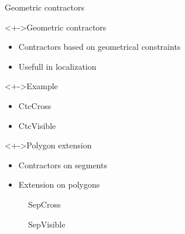 \documentclass[10pt, xcolor={usenames, dvipsnames}]{beamer}
\begin{document}
    \begin{frame}{Geometric contractors}
        \begin{minipage}[c]{.45\textwidth}
            \begin{block}<+->{Geometric contractors}
                \vspace{2.5mm}
                \begin{itemize}[<+->]
                    \item Contractors based on geometrical constraints
                    \item Usefull in localization
                \end{itemize}
            \end{block}
            \begin{exampleblock}<+->{Example}
                \begin{itemize}[<+->]
                    \item CtcCross
                    \item CtcVisible
                \end{itemize}
            \end{exampleblock}
            \begin{block}<+->{Polygon extension}
                \begin{itemize}[<+->]
                    \item Contractors on segments
                    \item Extension on polygons
                \end{itemize}
            \end{block}
        \end{minipage}%
        \hfill
        \begin{minipage}[c]{.5\textwidth}
            \begin{figure}
                \begin{overprint}
                    \centerline{}
                    \centerline{}
                \end{overprint}
                \vspace{-8mm}
                \begin{overprint}
                    \caption{SepCross}
                    \caption{SepVisible}
                \end{overprint}
            \end{figure}
        \end{minipage}
    \end{frame}
\end{document}
